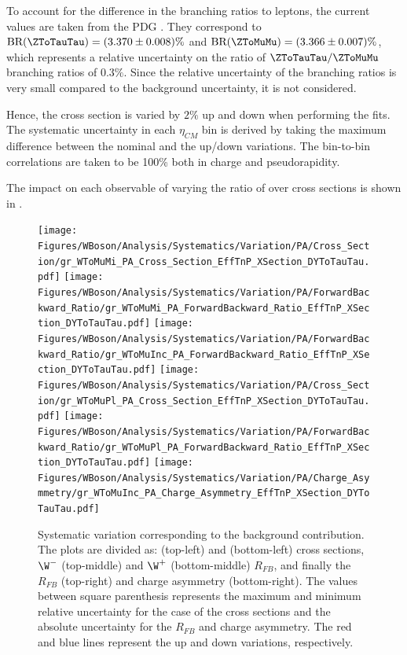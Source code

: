 To account for the difference in the \Z branching ratios to leptons, the current values are taken from the PDG \cite{PDG}. They correspond to $\textrm{BR}(\ZToTauTau) = (3.370 \pm 0.008)\%$ and $\textrm{BR}(\ZToMuMu) = (3.366 \pm 0.007)\%$, which represents a relative uncertainty on the ratio of $\ZToTauTau/\ZToMuMu$ branching ratios of $0.3\%$. Since the relative uncertainty of the \Z branching ratios is very small compared to the \DYToMuMu background uncertainty, it is not considered.

Hence, the \DYToTauTau cross section is varied by $2\%$ up and down when performing the fits. The systematic uncertainty in each $\eta_{CM}$ bin is derived by taking the maximum difference between the nominal and the up/down variations. The bin-to-bin correlations are taken to be 100\% both in charge and pseudorapidity.

The impact on each observable of varying the ratio of \DYToTauTau over \WToMuNu cross sections is shown in .

\begin{figure}[htbp]
 \begin{center}
  \texttt{[image: Figures/WBoson/Analysis/Systematics/Variation/PA/Cross\_Section/gr\_WToMuMi\_PA\_Cross\_Section\_EffTnP\_XSection\_DYToTauTau.pdf]}
  \texttt{[image: Figures/WBoson/Analysis/Systematics/Variation/PA/ForwardBackward\_Ratio/gr\_WToMuMi\_PA\_ForwardBackward\_Ratio\_EffTnP\_XSection\_DYToTauTau.pdf]}
  \texttt{[image: Figures/WBoson/Analysis/Systematics/Variation/PA/ForwardBackward\_Ratio/gr\_WToMuInc\_PA\_ForwardBackward\_Ratio\_EffTnP\_XSection\_DYToTauTau.pdf]}
  \texttt{[image: Figures/WBoson/Analysis/Systematics/Variation/PA/Cross\_Section/gr\_WToMuPl\_PA\_Cross\_Section\_EffTnP\_XSection\_DYToTauTau.pdf]}
  \texttt{[image: Figures/WBoson/Analysis/Systematics/Variation/PA/ForwardBackward\_Ratio/gr\_WToMuPl\_PA\_ForwardBackward\_Ratio\_EffTnP\_XSection\_DYToTauTau.pdf]}
  \texttt{[image: Figures/WBoson/Analysis/Systematics/Variation/PA/Charge\_Asymmetry/gr\_WToMuInc\_PA\_Charge\_Asymmetry\_EffTnP\_XSection\_DYToTauTau.pdf]}
 \end{center}
 \caption{Systematic variation corresponding to the \DYToTauTau background contribution. The plots are divided as: \WToMuNuMi (top-left) and \WToMuNuPl (bottom-left) cross sections, $\W^{-}$ (top-middle) and $\W^{+}$ (bottom-middle) $R_{FB}$, and finally the \W $R_{FB}$ (top-right) and \W charge asymmetry (bottom-right). The values between square parenthesis represents the maximum and minimum relative uncertainty for the case of the cross sections and the absolute uncertainty for the $R_{FB}$ and charge asymmetry. The red and blue lines represent the up and down variations, respectively.}
 \label{fig:Systematic_DYToTauTau}
\end{figure}

